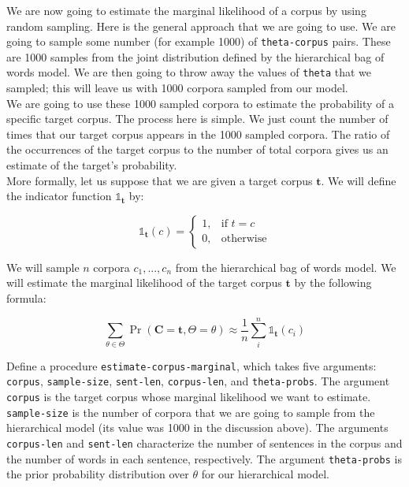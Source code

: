 \documentclass[10pt]{article}
\begin{document}
\noindent We are now going to estimate the marginal likelihood of a corpus by
using random sampling. Here is the general approach that we are going
to use. We are going to sample some number (for example 1000) of
\texttt{theta-corpus} pairs. These are 1000 samples from the joint
distribution defined by the hierarchical bag of words model. We are
then going to throw away the values of \texttt{theta} that we sampled;
this will leave us with 1000 corpora sampled from our model.
\\

\noindent We are going to use these 1000 sampled corpora to estimate
the probability of a specific target corpus. The process here is
simple. We just count the number of times that our target corpus
appears in the 1000 sampled corpora. The ratio of the occurrences of
the target corpus to the number of total corpora gives us an estimate
of the target's probability.
\\

\noindent More formally, let us suppose that we are given a target corpus
$\mathbf{t}$. We will define the indicator function
$\mathds{1}_{\mathbf{t}}$ by:

\begin{equation}
\mathds{1}_{\mathbf{t}}(c) = 
\begin{cases}
    1,& \text{if } t = c\\
    0,              & \text{otherwise}
\end{cases}
\end{equation}

\noindent We will sample $n$ corpora $c_1,...,c_n$ from the hierarchical bag of
words model. We will estimate the marginal likelihood of the target
corpus $\mathbf{t}$ by the following formula:

\begin{equation}
\label{eq:montecarlo-marginal}
\sum_{\theta \in \Theta} \Pr(\mathbf{C}=\mathbf{t}, \Theta=\theta)  \approx \frac{1}{n} \sum_{i}^{n}\mathds{1}_{\mathbf{t}}(c_i) 
\end{equation}

\noindent Define a procedure \texttt{estimate-corpus-marginal}, which
takes five arguments: \texttt{corpus}, \texttt{sample-size},
\texttt{sent-len}, \texttt{corpus-len}, and \texttt{theta-probs}. The
argument \texttt{corpus} is the target corpus whose marginal
likelihood we want to estimate. \texttt{sample-size} is the number of
corpora that we are going to sample from the hierarchical model (its
value was 1000 in the discussion above). The arguments
\texttt{corpus-len} and \texttt{sent-len} characterize the number of
sentences in the corpus and the number of words in each sentence,
respectively. The argument \texttt{theta-probs} is the prior
probability distribution over $\theta$ for our hierarchical model.
\\
\end{document}
